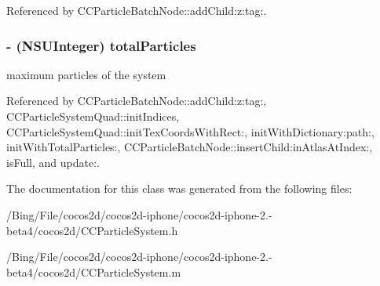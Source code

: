 Referenced by C\-C\-Particle\-Batch\-Node\-::add\-Child\-:z\-:tag\-:.

\hypertarget{interface_c_c_particle_system_a2f888085862e36db54c9e85a43375748}{
\subsubsection[{total\-Particles}]{\setlength{\rightskip}{0pt plus 5cm}-\/ (N\-S\-U\-Integer) {\bf total\-Particles}}}\label{interface_c_c_particle_system_a2f888085862e36db54c9e85a43375748}
maximum particles of the system 

Referenced by C\-C\-Particle\-Batch\-Node\-::add\-Child\-:z\-:tag\-:, C\-C\-Particle\-System\-Quad\-::init\-Indices, C\-C\-Particle\-System\-Quad\-::init\-Tex\-Coords\-With\-Rect\-:, init\-With\-Dictionary\-:path\-:, init\-With\-Total\-Particles\-:, C\-C\-Particle\-Batch\-Node\-::insert\-Child\-:in\-Atlas\-At\-Index\-:, is\-Full, and update\-:.



The documentation for this class was generated from the following files\-:\begin{DoxyCompactItemize}
\item 
/\-Bing/\-File/cocos2d/cocos2d-\/iphone/cocos2d-\/iphone-\/2.-\/beta4/cocos2d/C\-C\-Particle\-System.\-h\item 
/\-Bing/\-File/cocos2d/cocos2d-\/iphone/cocos2d-\/iphone-\/2.-\/beta4/cocos2d/C\-C\-Particle\-System.\-m\end{DoxyCompactItemize}
